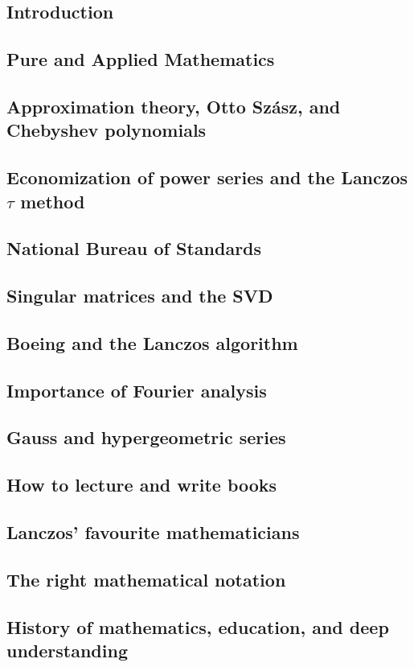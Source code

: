 \documentclass{article}
\begin{document}
\subsection{Introduction}
\subsection{Pure and Applied Mathematics}
\subsection{Approximation theory, Otto Szász, and Chebyshev polynomials}
\subsection{Economization of power series and the Lanczos $\tau$ method}
\subsection{National Bureau of Standards}
\subsection{Singular matrices and the SVD}
\subsection{Boeing and the Lanczos algorithm}
\subsection{Importance of Fourier analysis}
\subsection{Gauss and hypergeometric series}
\subsection{How to lecture and write books}
\subsection{Lanczos' favourite mathematicians}
\subsection{The right mathematical notation}
\subsection{History of mathematics, education, and deep understanding}
\end{document}
